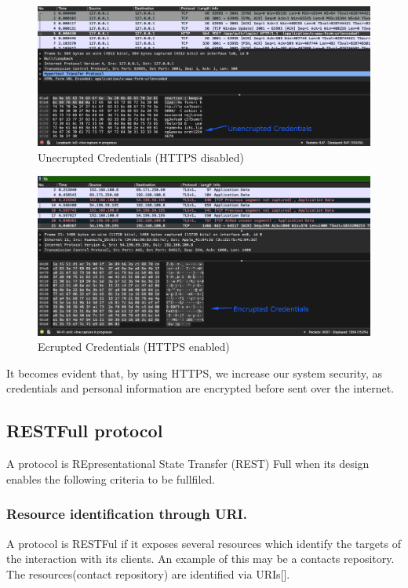 			\begin{figure}[H]
				\iftrue
				\caption{Unecrupted Credentials (HTTPS disabled)}
				\centering
				\includegraphics[scale=0.3]{figures/http}
				\fi
			\end{figure}
			\begin{figure}[H]
				\iftrue
				\caption{Ecrupted Credentials (HTTPS enabled)}
				\centering
				\includegraphics[scale=0.3]{figures/https}
				\fi
			\end{figure}
			It becomes evident that, by using HTTPS, we increase our system security, as credentials and personal information are encrypted before sent over the internet.
		\subsection{RESTFull protocol}
			A protocol is REpresentational State Transfer (REST) \cite{pautasso_zimmermann_leymann_2008}Full when its design enables the following criteria to be fullfiled.
			\subsubsection{Resource identification through URI.}
				A protocol is RESTFul if it exposes several resources which identify the targets of the interaction with its clients. 
				An example of this may be a contacts repository. The resources(contact repository) are identified via URIs[\cite{uri-rfc3986}].
